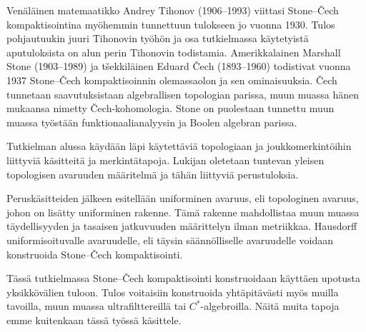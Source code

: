 \documentclass[12pt,a4paper,leqno]{report}
\theoremstyle{plain}
\theoremstyle{definition}
\theoremstyle{remark}
\begin{document}
Venäläinen matemaatikko Andrey Tihonov (1906--1993) viittasi Stone–Čech kompaktisointina myöhemmin tunnettuun tulokseen jo vuonna 1930. 
Tulos pohjautuukin juuri Tihonovin työhön ja osa tutkielmassa käytetyistä aputuloksista on alun perin Tihonovin todistamia. 
Amerikkalainen Marshall Stone (1903--1989) ja tšekkiläinen Eduard Čech (1893--1960) todistivat vuonna 1937 Stone–Čech kompaktisoinnin olemassaolon ja sen ominaisuuksia. 
Čech tunnetaan saavutuksistaan algebrallisen topologian parissa, muun muassa hänen mukaansa nimetty Čech-kohomologia. 
Stone on puolestaan tunnettu muun muassa työstään funktionaalianalyysin ja Boolen algebran parissa. 

Tutkielman alussa käydään läpi käytettäviä topologiaan ja joukkomerkintöihin liittyviä käsitteitä ja merkintätapoja. 
Lukijan oletetaan tuntevan yleisen topologisen avaruuden määritelmä ja tähän liittyviä perustuloksia. 

Peruskäsitteiden jälkeen esitellään uniforminen avaruus, eli 
topologinen avaruus, johon on lisätty uniforminen rakenne. 
Tämä rakenne mahdollistaa muun muassa täydellisyyden ja tasaisen jatkuvuuden määrittelyn ilman metriikkaa. 
Hausdorff uniformisoituvalle avaruudelle, eli täysin säännölliselle avaruudelle voidaan konstruoida Stone–Čech kompaktisointi.

Tässä tutkielmassa Stone–Čech kompaktisointi konstruoidaan käyttäen upotusta yksikkövälien tuloon. 
Tulos voitaisiin konstruoida yhtäpitävästi myös muilla tavoilla, muun muassa ultrafilttereillä tai $C^*$-algebroilla. 
Näitä muita tapoja emme kuitenkaan tässä työssä käsittele. 
\end{document}
